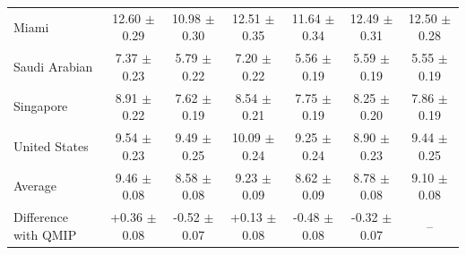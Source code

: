 \begin{tabular}{lcccccc}
Miami & 12.60 $\pm$ 0.29 & 10.98 $\pm$ 0.30 & 12.51 $\pm$ 0.35 & 11.64 $\pm$ 0.34 & 12.49 $\pm$ 0.31 & 12.50 $\pm$ 0.28 \\
Saudi Arabian & 7.37 $\pm$ 0.23 & 5.79 $\pm$ 0.22 & 7.20 $\pm$ 0.22 & 5.56 $\pm$ 0.19 & 5.59 $\pm$ 0.19 & 5.55 $\pm$ 0.19 \\
Singapore & 8.91 $\pm$ 0.22 & 7.62 $\pm$ 0.19 & 8.54 $\pm$ 0.21 & 7.75 $\pm$ 0.19 & 8.25 $\pm$ 0.20 & 7.86 $\pm$ 0.19 \\
United States & 9.54 $\pm$ 0.23 & 9.49 $\pm$ 0.25 & 10.09 $\pm$ 0.24 & 9.25 $\pm$ 0.24 & 8.90 $\pm$ 0.23 & 9.44 $\pm$ 0.25 \\
\midrule
Average & 9.46 $\pm$ 0.08 & 8.58 $\pm$ 0.08 & 9.23 $\pm$ 0.09 & 8.62 $\pm$ 0.09 & 8.78 $\pm$ 0.08 & 9.10 $\pm$ 0.08 \\
Difference with QMIP & +0.36 $\pm$ 0.08 & -0.52 $\pm$ 0.07 & +0.13 $\pm$ 0.08 & -0.48 $\pm$ 0.08 & -0.32 $\pm$ 0.07 & -- \\
\bottomrule
\end{tabular}
